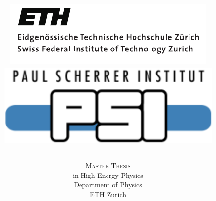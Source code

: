 \documentclass[10pt]{report}
\begin{document}
\begin{titlepage}
\title{
    \begin{figure}
    \includegraphics[scale=0.65]{pictures/ethlogo_full}
    \hfill
    \includegraphics[scale=0.4]{pictures/psi_logo_blue}
    \end{figure}\vspace*{-5cm}
\FloatBarrier\parindent 0pt
\bfseries {\huge {}}
}
\author{
        \textsc{{{\LARGE Master Thesis}}} \\[5pt]
        \small in High Energy Physics  \\[5pt]
        \small Department of Physics \\[5pt] \small ETH Zurich \vspace{0.4cm} \\[0.2in]
}
\end{titlepage}
\end{document}
